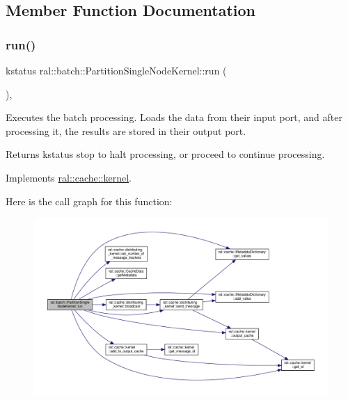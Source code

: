 \subsection{Member Function Documentation}
\mbox{\label{classral_1_1batch_1_1PartitionSingleNodeKernel_a5af293b33505bec1e9fb66f9bb9d29af}} 
\subsubsection{\texorpdfstring{run()}{run()}}
{\footnotesize\ttfamily kstatus ral\+::batch\+::\+Partition\+Single\+Node\+Kernel\+::run (\begin{DoxyParamCaption}{ }\end{DoxyParamCaption})\hspace{0.3cm}{\ttfamily [override]}, {\ttfamily [virtual]}}



Executes the batch processing. Loads the data from their input port, and after processing it, the results are stored in their output port. 

\begin{DoxyReturn}{Returns}
kstatus \textquotesingle{}stop\textquotesingle{} to halt processing, or \textquotesingle{}proceed\textquotesingle{} to continue processing. 
\end{DoxyReturn}


Implements \hyperlink{classral_1_1cache_1_1kernel_a735b081cccae9574924e74ea6d293ef7}{ral\+::cache\+::kernel}.

Here is the call graph for this function\+:\nopagebreak
\begin{figure}[H]
\begin{center}
\leavevmode
\includegraphics[width=350pt]{classral_1_1batch_1_1PartitionSingleNodeKernel_a5af293b33505bec1e9fb66f9bb9d29af_cgraph}
\end{center}
\end{figure}


